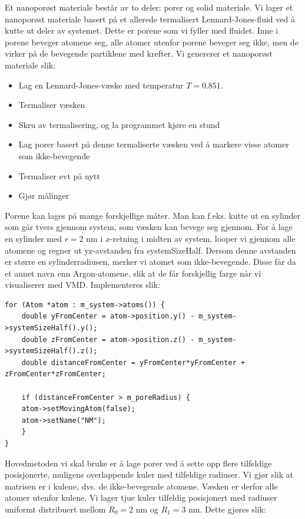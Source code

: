\documentclass[english, a4paper]{article}
\begin{document}
\noindent
Et nanoporøst materiale består av to deler: porer og solid materiale. Vi lager et nanoporøst materiale
basert på et allerede termalisert Lennard-Jones-fluid ved å kutte ut deler av systemet. Dette er porene som vi
fyller med fluidet. Inne i porene beveger atomene seg, alle atomer utenfor porene beveger seg ikke, men 
de virker på de bevegende partiklene med krefter. Vi genererer et nanoporøst materiale slik:
\begin{itemize}
 \item Lag en Lennard-Jones-væske med temperatur $T = 0.851$. 
 \item Termaliser væsken
 \item Skru av termalisering, og la programmet kjøre en stund
 \item Lag porer basert på denne termaliserte væsken ved å markere visse atomer som ikke-bevegende
 \item Termaliser evt på nytt
 \item Gjør målinger
\end{itemize}
Porene kan lages på mange forskjellige måter. Man kan f.eks. kutte ut en sylinder som går tvers gjennom
system, som væsken kan bevege seg gjennom. For å lage en sylinder med $r =2$ nm i $x$-retning i midten av system, 
looper vi gjennom alle atomene og regner ut yz-avstanden fra systemSizeHalf. Dersom denne avstanden
er større en sylinderradiusen, merker vi atomet som ikke-bevegende. Disse får da et annet navn enn
Argon-atomene, slik at de får forskjellig farge når vi visualiserer med VMD. Implementeres slik:
\begin{lstlisting}
for (Atom *atom : m_system->atoms()) {
    double yFromCenter = atom->position.y() - m_system->systemSizeHalf().y();
    double zFromCenter = atom->position.z() - m_system->systemSizeHalf().z();
    double distanceFromCenter = yFromCenter*yFromCenter + zFromCenter*zFromCenter;

    if (distanceFromCenter > m_poreRadius) {
	atom->setMovingAtom(false);
	atom->setName("NM");
    }
}
\end{lstlisting}
Hovedmetoden vi skal bruke er å lage porer ved å sette opp flere tilfeldige posisjonerte,
muligens overlappende kuler
med tilfeldige radiuser. Vi gjør slik at matrisen er i kulene, dvs. de ikke-bevegende atomene. 
Væsken er derfor alle atomer utenfor kulene. Vi lager tjue kuler tilfeldig posisjonert med
radiuser uniformt distribuert mellom $R_0 = 2$ nm og $R_1 = 3$ nm. Dette gjøres slik:
\end{document}

